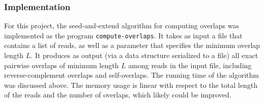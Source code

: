 \documentclass[12pt]{article}
\newcommand{\ProgramName}[1]{{\tt #1}}
\begin{document}
\subsubsection{Implementation}

For this project, the seed-and-extend algorithm for computing overlaps was
implemented as the program \ProgramName{compute-overlaps}.  It takes as input a
file that contains a list of reads, as well as a parameter that specifies the
minimum overlap length $L$.  It produces as output (via a data structure
serialized to a file) all exact pairwise overlaps of minimum length $L$ among
reads in the input file, including reverse-complement overlaps and
self-overlaps.  The running time of the algorithm was discussed above.  The
memory usage is linear with respect to the total length of the reads and the
number of overlaps, which likely could be improved.
\end{document}
